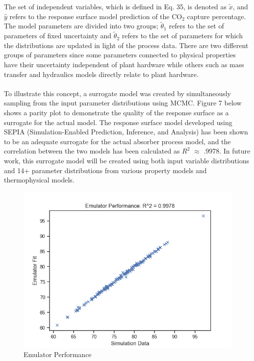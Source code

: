 \documentclass[12pt, letterpaper]{article}
\begin{document}
The set of independent variables, which is defined in Eq. 35, is denoted as $\tilde{x}$, and $\hat{y}$ refers to the response surface model prediction of the $\mathrm{CO}_2$ capture percentage. The model parameters are divided into two groups; $\tilde{\theta}_1$ refers to the set of parameters of fixed uncertainty and $\tilde{\theta}_2$ refers to the set of parameters for which the distributions are updated in light of the process data. There are two different groups of parameters since some parameters connected to physical properties have their uncertainty independent of plant hardware while others such as mass transfer and hydraulics models directly relate to plant hardware. 

\paragraph{}
To illustrate this concept, a surrogate model was created by simultaneously sampling from the input parameter distributions using MCMC. Figure 7 below shows a parity plot to demonstrate the quality of the response surface as a surrogate for the actual model. The response surface model developed using SEPIA (Simulation-Enabled Prediction, Inference, and Analysis) has been shown to be an adequate surrogate for the actual absorber process model, and the correlation between the two models has been calculated as $R^2$ $\approx$ .9978. In future work, this surrogate model will be created using both input variable distributions and 14+ parameter distributions from various property models and thermophysical models.

\begin{figure}[ht]
    \centering
    \includegraphics[width=14cm]{Emulator_Fit.png}
    \caption{Emulator Performance}
\end{figure}
\end{document}
